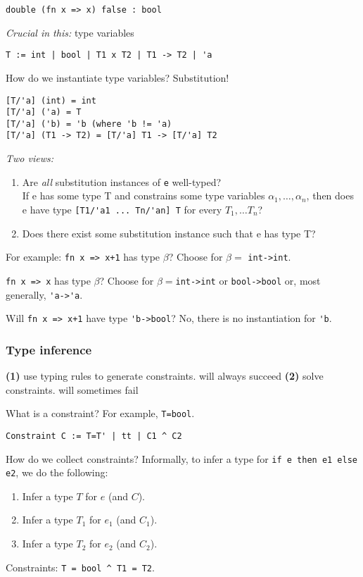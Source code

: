 \documentclass[11pt]{article}
\begin{document}
\begin{verbatim}
double (fn x => x) false : bool
\end{verbatim}

\emph{Crucial in this:} type variables
\begin{verbatim}
T := int | bool | T1 x T2 | T1 -> T2 | 'a
\end{verbatim}
How do we instantiate type variables? Substitution!
\begin{verbatim}
[T/'a] (int) = int
[T/'a] ('a) = T
[T/'a] ('b) = 'b (where 'b != 'a)
[T/'a] (T1 -> T2) = [T/'a] T1 -> [T/'a] T2
\end{verbatim}

\emph{Two views:}
\begin{enumerate}
    \item Are \emph{all} substitution instances of \verb~e~ well-typed? \\
        If e has some type T and constrains some type variables $\alpha_1, \ldots, \alpha_n$, then does e have type \verb~[T1/'a1 ... Tn/'an] T~ for every $T_1, \ldots T_n$?
    \item Does there exist some substitution instance such that e has type T?
\end{enumerate}

For example: \verb~fn x => x+1~ has type $\beta$? Choose for $\beta =$ \verb~int->int~.

\verb~fn x => x~ has type $\beta$? Choose for $\beta=$\verb~int->int~ or \verb~bool->bool~ or, most generally, \verb~'a->'a~.

Will \verb~fn x => x+1~ have type \verb~'b->bool~? No, there is no instantiation for \verb~'b~.

\subsubsection{Type inference}
\textbf{(1)} use typing rules to generate constraints. \textleftarrow will always succeed
\textbf{(2)} solve constraints. \textleftarrow will sometimes fail

What is a constraint? For example, \verb~T=bool~.

\begin{verbatim}
Constraint C := T=T' | tt | C1 ^ C2
\end{verbatim}

How do we collect constraints? Informally, to infer a type for \verb~if e then e1 else e2~, we do the following:
\begin{enumerate}
    \item Infer a type $T$ for $e$ (and $C$).
    \item Infer a type $T_1$ for $e_1$ (and $C_1$).
    \item Infer a type $T_2$ for $e_2$ (and $C_2$).
\end{enumerate}
Constraints: \verb~T = bool ^ T1 = T2~.
\end{document}
